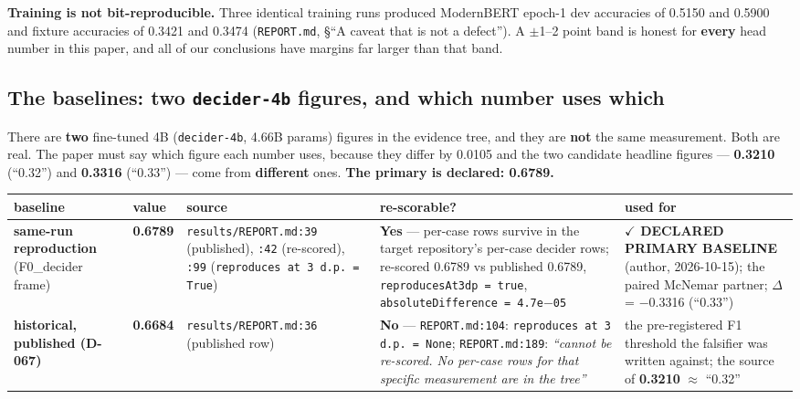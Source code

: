 \documentclass[11pt,a4paper]{article}
\begin{document}
\textbf{Training is not bit-reproducible.} Three identical training runs produced ModernBERT epoch-1 dev accuracies of 0.5150 and 0.5900 and fixture accuracies of 0.3421 and 0.3474 (\texttt{REPORT.md}, \S``A caveat that is not a defect''). A $\pm$1--2 point band is honest for \textbf{every} head number in this paper, and all of our conclusions have margins far larger than that band.

\subsection{The baselines: two \texttt{decider-4b} figures, and which number uses which}

There are \textbf{two} fine-tuned 4B (\texttt{decider-4b}, 4.66B params) figures in the evidence tree, and they are \textbf{not} the same measurement. Both are real. The paper must say which figure each number uses, because they differ by 0.0105 and the two candidate headline figures --- \textbf{0.3210} (``0.32'') and \textbf{0.3316} (``0.33'') --- come from \textbf{different} ones. \textbf{The primary is declared: 0.6789.}

\footnotesize

\begin{center}
\begin{tabular}{@{}>{\raggedright\arraybackslash}p{}>{\raggedright\arraybackslash}p{}>{\raggedright\arraybackslash}p{}>{\raggedright\arraybackslash}p{}>{\raggedright\arraybackslash}p{}@{}}
\hline
\textbf{baseline} & \textbf{value} & \textbf{source} & \textbf{re-scorable?} & \textbf{used for} \\ \hline
\textbf{same-run reproduction} (F0\_decider frame) & \textbf{0.6789} & \texttt{results/REPORT.md:39} (published), \texttt{:42} (re-scored), \texttt{:99} (\texttt{reproduces at 3 d.p. = True}) & \textbf{Yes} --- per-case rows survive in the target repository's per-case decider rows; re-scored 0.6789 vs published 0.6789, \texttt{reproducesAt3dp = true}, \texttt{absoluteDifference = 4.7e$-$05} & \textbf{$\checkmark$ DECLARED PRIMARY BASELINE} (author, 2026-10-15); the paired McNemar partner; $\Delta$ = $-$0.3316 (``0.33'') \\ \hline
\textbf{historical, published (D-067)} & \textbf{0.6684} & \texttt{results/REPORT.md:36} (published row) & \textbf{No} --- \texttt{REPORT.md:104}: \texttt{reproduces at 3 d.p. = None}; \texttt{REPORT.md:189}: \emph{``cannot be re-scored. No per-case rows for that specific measurement are in the tree''} & the pre-registered F1 threshold the falsifier was written against; the source of \textbf{0.3210} $\approx$ ``0.32'' \\ \hline
\end{tabular}
\end{center}
\end{document}
